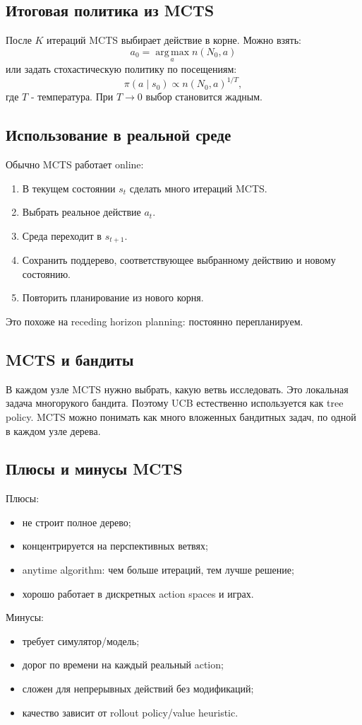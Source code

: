 \documentclass[11pt,a4paper]{article}
\newcommand{\argmax}{\operatorname*{arg\,max}}
\newcommand{\1}{\mathbf{1}}
\begin{document}
\subsection*{Итоговая политика из MCTS}
После $K$ итераций MCTS выбирает действие в корне. Можно взять:
\[
    a_0=\argmax_a n(N_0,a)
\]
или задать стохастическую политику по посещениям:
\[
    \pi(a\mid s_0)\propto n(N_0,a)^{1/T},
\]
где $T$ - температура. При $T\to0$ выбор становится жадным.

\subsection*{Использование в реальной среде}
Обычно MCTS работает online:
\begin{enumerate}
    \item В текущем состоянии $s_t$ сделать много итераций MCTS.
    \item Выбрать реальное действие $a_t$.
    \item Среда переходит в $s_{t+1}$.
    \item Сохранить поддерево, соответствующее выбранному действию и новому состоянию.
    \item Повторить планирование из нового корня.
\end{enumerate}
Это похоже на receding horizon planning: постоянно перепланируем.

\subsection*{MCTS и бандиты}
В каждом узле MCTS нужно выбрать, какую ветвь исследовать. Это локальная задача многорукого бандита. Поэтому UCB естественно используется как tree policy. MCTS можно понимать как много вложенных бандитных задач, по одной в каждом узле дерева.

\subsection*{Плюсы и минусы MCTS}
Плюсы:
\begin{itemize}
    \item не строит полное дерево;
    \item концентрируется на перспективных ветвях;
    \item anytime algorithm: чем больше итераций, тем лучше решение;
    \item хорошо работает в дискретных action spaces и играх.
\end{itemize}
Минусы:
\begin{itemize}
    \item требует симулятор/модель;
    \item дорог по времени на каждый реальный action;
    \item сложен для непрерывных действий без модификаций;
    \item качество зависит от rollout policy/value heuristic.
\end{itemize}
\end{document}
